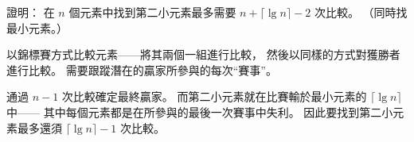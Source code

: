 
\startEXERCISE
證明：
在 $n$ 個元素中找到第二小元素最多需要 $n+\lceil\lg{n}\rceil-2$ 次比較。
（\hint 同時找最小元素。）
\stopEXERCISE

\startANSWER
以錦標賽方式比較元素——將其兩個一組進行比較，
然後以同樣的方式對獲勝者進行比較。
需要跟蹤潛在的贏家所參與的每次“賽事”。

通過 $n-1$ 次比較確定最終贏家。
而第二小元素就在比賽輸於最小元素的 $\lceil\lg{n}\rceil$ 中——
其中每個元素都是在所參與的最後一次賽事中失利。
因此要找到第二小元素最多還須 $\lceil\lg{n}\rceil - 1$ 次比較。
\stopANSWER
